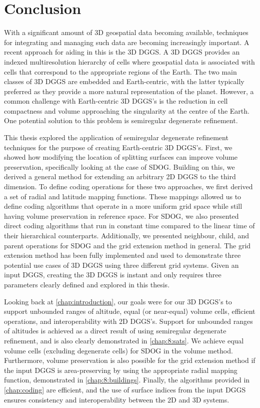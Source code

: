 \chapter{Conclusion} \label{chap:conclusion}
With a significant amount of 3D geospatial data becoming available, techniques for integrating and managing such data are becoming increasingly important.
A recent approach for aiding in this is the 3D DGGS.
A 3D DGGS provides an indexed multiresolution hierarchy of cells where geospatial data is associated with cells that correspond to the appropriate regions of the Earth.
The two main classes of 3D DGGS are embedded and Earth-centric, with the latter typically preferred as they provide a more natural representation of the planet.
However, a common challenge with Earth-centric 3D DGGS's is the reduction in cell compactness and volume approaching the singularity at the centre of the Earth.
One potential solution to this problem is semiregular degenerate refinement.


This thesis explored the application of semiregular degenerate refinement techniques for the purpose of creating Earth-centric 3D DGGS's.
First, we showed how modifying the location of splitting surfaces can improve volume preservation, specifically looking at the case of SDOG.
Building on this, we derived a general method for extending an arbitrary 2D DGGS to the third dimension.
To define coding operations for these two approaches, we first derived a set of radial and latitude mapping functions.
These mappings allowed us to define coding algorithms that operate in a more uniform grid space while still having volume preservation in reference space.
For SDOG, we also presented direct coding algorithms that run in constant time compared to the linear time of their hierarchical counterparts.
Additionally, we presented neighbour, child, and parent operations for SDOG and the grid extension method in general.
The grid extension method has been fully implemented and used to demonstrate three potential use cases of 3D DGGS using three different grid systems.
Given an input DGGS, creating the 3D DGGS is instant and only requires three parameters clearly defined and explored in this thesis.


Looking back at \cref{chap:introduction}, our goals were for our 3D DGGS's to support unbounded ranges of altitude, equal (or near-equal) volume cells, efficient operations, and interoperability with 2D DGGS's.
Support for unbounded ranges of altitudes is achieved as a direct result of using semiregular degenerate refinement, and is also clearly demonstrated in \cref{chap:8:sats}.
We achieve equal volume cells (excluding degenerate cells) for SDOG in the volume method.
Furthermore, volume preservation is also possible for the grid extension method if the input DGGS is area-preserving by using the appropriate radial mapping function, demonstrated in \cref{chap:8:buildings}.
Finally, the algorithms provided in \cref{chap:coding} are efficient, and the use of surface indices from the input DGGS ensures consistency and interoperability between the 2D and 3D systems.



